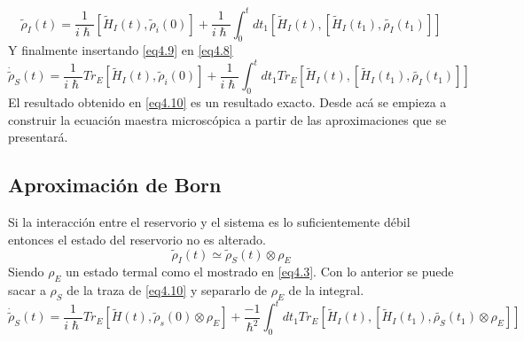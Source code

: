 \documentclass{book}
\begin{document}
\begin{equation}\label{eq4.9}\tilde{\rho}_I(t)=\frac{1}{i\hslash}[\tilde{H}_I(t),\tilde{\rho}_i(0)]+\frac{1}{i\hslash}\int_0^t dt_1[\tilde{H}_I(t),[\tilde{H}_I(t_1),\tilde{\rho_I}(t_1)]]\end{equation}
Y finalmente insertando \ref{eq4.9} en \ref{eq4.8}
\begin{equation}\label{eq4.10}\dot{\tilde{\rho}}_S(t)=\frac{1}{i\hslash}Tr_E[\tilde{H}_I(t),\tilde{\rho}_i(0)]+\frac{1}{i\hslash}\int_0^t dt_1Tr_E[\tilde{H}_I(t),[\tilde{H}_I(t_1),\tilde{\rho_I}(t_1)]]\end{equation}
El resultado obtenido en \ref{eq4.10} es un resultado exacto. Desde acá se empieza a construir la ecuación maestra microscópica a partir de las aproximaciones que se presentará.
\subsection{Aproximación de Born} Si la interacción entre el reservorio y el sistema es lo suficientemente débil entonces el estado del reservorio no es alterado. 
\begin{equation}\label{eq4.11}\tilde{\rho}_I(t)\simeq\tilde{\rho}_S(t)\otimes\rho_E\end{equation}
Siendo $\rho_E$ un estado termal como el mostrado en \ref{eq4.3}. Con lo anterior se puede sacar a $\rho_S$ de la traza de \ref{eq4.10} y separarlo de $\rho_E$ de la integral.
\begin{equation}\label{eq4.12}\dot{\tilde{\rho}}_S(t)=\frac{1}{i\hslash}Tr_E[\tilde{H}(t),\tilde{\rho}_s(0)\otimes\rho_E]+\frac{-1}{\hslash^2}\int_0^t dt_1 Tr_E[\tilde{H}_I(t),[\tilde{H}_I(t_1),\tilde{\rho_S}(t_1)\otimes\rho_E]]\end{equation}
\end{document}
